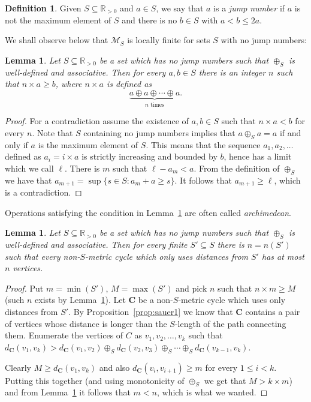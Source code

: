 \documentclass{elsarticle}
\def\str#1{\mathbf {#1}}
\theoremstyle{plain}
\newtheorem{lemma}[theorem]{Lemma}
\theoremstyle{definition}
\newtheorem{definition}[theorem]{Definition}
\theoremstyle{remark}
\begin{document}
\begin{definition}
\label{defn:jump}
Given $S\subseteq \mathbb R_{>0}$ and $a\in S$, we say that $a$ is a \emph{jump
number} if $a$ is not the maximum element of $S$ and there is no $b\in S$ with $a < b \leq 2a$.
\end{definition}
We shall observe below that $\mathcal M_S$ is locally finite for sets $S$ with no jump numbers:


\begin{lemma}
\label{lem:archimedean}
Let $S\subseteq \mathbb R_{>0}$ be a set which has no jump numbers such that $\oplus_S$ is well-defined and associative. Then for every $a, b\in S$ there is an integer $n$ such that $n\times a \geq b$, where $n\times a$ is defined as
$$\underbrace{a\oplus a\oplus \cdots \oplus a}_{n\text{ times}}.$$
\end{lemma}
\begin{proof}
For a contradiction assume the existence of $a,b\in S$ such that $n\times a < b$ for every $n$. Note that $S$ containing no jump numbers implies that $a\oplus_S a = a$ if and only if $a$ is the maximum element of $S$. This means that the sequence $a_1, a_2, \ldots$ defined as $a_i = i\times a$ is strictly increasing and bounded by $b$, hence has a limit which we call $\ell$. There is $m$ such that $\ell-a_m < a$. From the definition of $\oplus_S$ we have that $a_{m+1} = \sup\{s\in S : a_m + a \geq s\}$. It follows that $a_{m+1} \geq \ell$, which is a contradiction. 
\end{proof}

Operations satisfying the condition in Lemma~\ref{lem:archimedean} are often called \emph{archi\-medean}.

\begin{lemma}
\label{lem:nonSmetric}
Let $S\subseteq \mathbb R_{>0}$ be a set which has no jump numbers such that $\oplus_S$ is well-defined and associative. Then for every finite $S'\subseteq S$ there is $n=n(S')$ such that every non-$S$-metric cycle which only uses distances from $S'$
has at most $n$ vertices.
\end{lemma}
\begin{proof}
Put $m=\min(S')$, $M=\max(S')$ and pick $n$ such that $n\times m\geq M$ (such $n$ exists by Lemma~\ref{lem:archimedean}). Let $\str C$ be a non-$S$-metric cycle which uses only distances from $S'$. By Proposition~\ref{prop:sauer1} we know that $\str{C}$
contains a pair of vertices whose distance is longer than the $S$-length of the path connecting them.
Enumerate the vertices of $C$ as $v_1,v_2,\ldots,v_k$
such that $d_\str{C}(v_1,v_k)>d_\str{C}(v_1,v_2)\oplus_S d_\str{C}(v_2,v_3)\oplus_S\cdots \oplus_S d_\str{C}(v_{k-1},v_k)$.

Clearly $M\geq d_\str C(v_1, v_k)$ and also $d_\str{C}(v_i,v_{i+1})\geq m$ for every $1\leq i < k$. Putting this together (and using monotonicity of $\oplus_S$ we get that $M > k\times m$) and from Lemma~\ref{lem:archimedean} it follows that $m < n$, which is what we wanted.
\end{proof}
\end{document}
